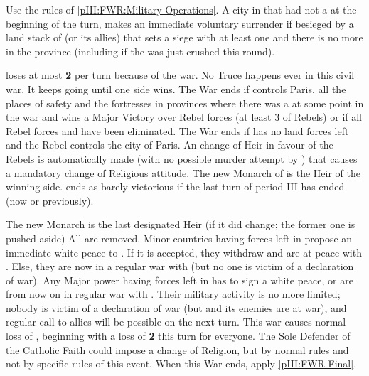 \begin{digressions}



  \phmil
  \aparag Use the rules of \ref{pIII:FWR:Military Operations}.
  \aparag A city in \FRA that had not a \REVOLT \faceplus at the beginning of
  the turn, makes an immediate voluntary surrender if besieged by a land stack
  of \FRA (or its allies) that sets a siege with at least one \ARMY \faceplus
  and there is no more \REVOLT in the province (including if the \REVOLT was
  just crushed this round).



  \phpaix
  \aparag \FRA loses at most {\bf 2} \STAB per turn because of the war.
  \aparag No Truce happens ever in this civil war. It keeps going until one
  side wins.
  \aparag The War ends if \FRA controls Paris, all the places of safety and
  the fortresses in provinces where there was a \REVOLT\faceplus at some point
  in the war and wins a Major Victory over
  Rebel forces (at least 3 \DT of Rebels) or if all Rebel forces and \REVOLT
  have been eliminated.
  \aparag The War ends if \FRA has no land forces left and the Rebel controls
  the city of Paris. An change of Heir in favour of the Rebels is
  automatically made (with no possible murder attempt by \FRA) that causes a
  mandatory change of Religious attitude. The new Monarch of \FRA is the Heir
  of the winning side.
  \aparag \FRA ends as barely victorious if the last turn of period III has
  ended (now or previously).



  \phpaix
  \bparag The new Monarch is the last designated Heir (if it did change; the
  former one is pushed aside)
  \bparag All \REVOLT %
  are removed.
  \bparag Minor countries having forces left in \FRA propose an immediate
  white peace to \FRA. If it is accepted, they withdraw and are at peace with
  \FRA. Else, they are now in a regular war with \FRA (but no one is victim of
  a declaration of war).
  \bparag Any Major power having forces left in \FRA has to sign a white
  peace, or are from now on in regular war with \FRA.  Their military activity
  is no more limited; nobody is victim of a declaration of war (but \FRA and
  its enemies are at war), and regular call to allies will be possible on the
  next turn.  This war causes normal loss of \STAB, beginning with a loss of
  {\bf 2} \STAB this turn for everyone.  The Sole Defender of the Catholic
  Faith could impose a change of Religion, but by normal rules and not by
  specific rules of this event.
  \bparag When this War ends, apply \ref{pIII:FWR Final}.
\end{digressions}



